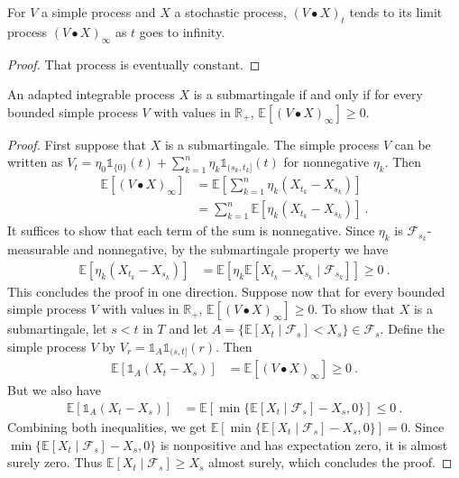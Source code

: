 \begin{lemma}\label{lem:tendsto_elemStochIntegral_limitProcess}
For $V$ a simple process and $X$ a stochastic process, $(V \bullet X)_t$ tends to its limit process $(V \bullet X)_\infty$ as $t$ goes to infinity.
\end{lemma}

\begin{proof}
That process is eventually constant.
\end{proof}


\begin{lemma}\label{lem:submartingale_iff_integral_elemStochIntegral_nonneg}
An adapted integrable process $X$ is a submartingale if and only if for every bounded simple process $V$ with values in $\mathbb{R}_+$, $\mathbb{E}[(V \bullet X)_\infty] \ge 0$.
\end{lemma}

\begin{proof}
First suppose that $X$ is a submartingale.
The simple process $V$ can be written as $V_t = \eta_0 \mathbb{1}_{\{0\}}(t) + \sum_{k=1}^{n} \eta_k \mathbb{1}_{(s_k, t_k]}(t)$ for nonnegative $\eta_k$. Then
\begin{align*}
  \mathbb{E}[(V \bullet X)_\infty]
  &= \mathbb{E}\left[\sum_{k=1}^{n} \eta_k (X_{t_k} - X_{s_k})\right]
  \\
  &= \sum_{k=1}^{n} \mathbb{E}[\eta_k (X_{t_k} - X_{s_k})]
  \: .
\end{align*}
It suffices to show that each term of the sum is nonnegative.
Since $\eta_k$ is $\mathcal{F}_{s_k}$-measurable and nonnegative, by the submartingale property we have
\begin{align*}
  \mathbb{E}[\eta_k (X_{t_k} - X_{s_k})]
  &= \mathbb{E}[\eta_k \mathbb{E}[X_{t_k} - X_{s_k} \mid \mathcal{F}_{s_k}]]
  \ge 0
  \: .
\end{align*}
This concludes the proof in one direction.
Suppose now that for every bounded simple process $V$ with values in $\mathbb{R}_+$, $\mathbb{E}[(V \bullet X)_\infty] \ge 0$.
To show that $X$ is a submartingale, let $s < t$ in $T$ and let $A = \{\mathbb{E}[X_t \mid \mathcal{F}_s] < X_s\} \in \mathcal{F}_s$.
Define the simple process $V$ by $V_r = \mathbb{1}_A \mathbb{1}_{(s, t]}(r)$.
Then
\begin{align*}
  \mathbb{E}[\mathbb{1}_A (X_t - X_s)]
  &= \mathbb{E}[(V \bullet X)_\infty]
  \ge 0
  \: .
\end{align*}
But we also have
\begin{align*}
  \mathbb{E}[\mathbb{1}_A (X_t - X_s)]
  &= \mathbb{E}[\min\{\mathbb{E}[X_t \mid \mathcal{F}_s] - X_s, 0\}]
  \le 0
  \: .
\end{align*}
Combining both inequalities, we get $\mathbb{E}[\min\{\mathbb{E}[X_t \mid \mathcal{F}_s] - X_s, 0\}] = 0$.
Since $\min\{\mathbb{E}[X_t \mid \mathcal{F}_s] - X_s, 0\}$ is nonpositive and has expectation zero, it is almost surely zero.
Thus $\mathbb{E}[X_t \mid \mathcal{F}_s] \ge X_s$ almost surely, which concludes the proof.
\end{proof}


